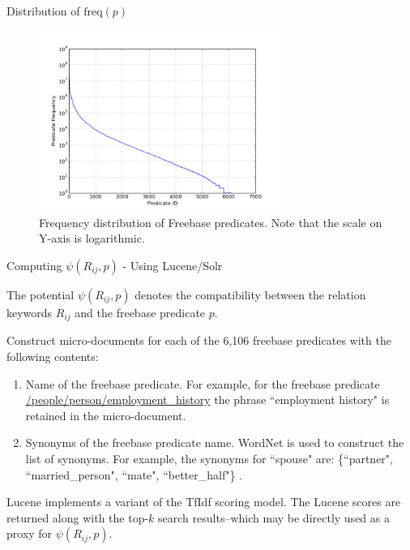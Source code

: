 \documentclass[pdf,11pt]{beamer}
\begin{document}

\begin{frame}{Distribution of $\text{freq}(p)$}

\begin{figure}[h!] \label{preddist}
\centering
\includegraphics[width=0.7\textwidth]{./images/pred-freq}
\caption{Frequency distribution of Freebase predicates. Note that the scale on Y-axis is logarithmic.}
\end{figure}

\end{frame}

\begin{frame}{Computing $\psi(R_{ij},p)$ - Using Lucene/Solr}
\begin{block}{}
The potential $\psi(R_{ij},p)$ denotes the compatibility between the relation keywords $R_{ij}$ and the freebase predicate $p$.
\end{block}

Construct micro-documents for each of the 6,106 freebase predicates with the following contents:
\begin{enumerate}
\item Name of the freebase predicate. For example, for the freebase predicate \url{/people/person/employment_history} the phrase ``employment history" is retained in the micro-document.
\item Synonyms of the freebase predicate name. WordNet is used to construct the list of synonyms. For example, the synonyms for ``spouse" are: \{``partner", ``married\_person", ``mate", ``better\_half"\}
.\end{enumerate}

\end{frame}

\begin{frame}
Lucene implements a variant of the TfIdf scoring model. The Lucene scores are returned along with the top-$k$ search results--which may be directly used as a proxy for $\psi(R_{ij}, p)$.
\end{frame}
\end{document}

